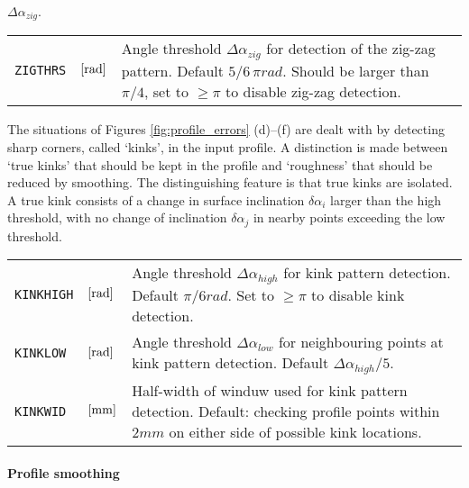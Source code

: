 \documentclass[12pt]{report}
\newenvironment{inputvars}{\vspace{0.4\baselineskip}%

\begin{tabular}{>{\raggedright}p{22mm}p{19mm}p{113mm}}}{
\end{tabular}

}
\newcommand{\inpvar}[3]{{\small\tt #1} & $#2$ & #3 \\[1ex]}
\begin{document}
$\Delta\alpha_{zig}$. 
\begin{inputvars}
\inpvar{ZIGTHRS}{\bunit{rad}}{Angle threshold $\Delta\alpha_{zig}$ for
        detection of the zig-zag pattern. Default $5/6\,\pi\unit{rad}$.
        Should be larger than $\pi/4$, set to $\ge\pi$ to disable zig-zag
        detection.}
\end{inputvars}
The situations of Figures \ref{fig:profile_errors} (d)--(f) are dealt with
by detecting sharp corners, called `kinks', in the input profile. A
distinction is made between `true kinks' that should be kept in the profile
and `roughness' that should be reduced by smoothing. The distinguishing
feature is that true kinks are isolated. A true kink consists of a change
in surface inclination $\delta\alpha_i$ larger than the high threshold,
with no change of inclination $\delta\alpha_j$ in nearby points exceeding
the low threshold. 
\begin{inputvars}
\inpvar{KINKHIGH}{\bunit{rad}}{Angle threshold $\Delta\alpha_{high}$ for
        kink pattern detection. Default $\pi/6\unit{rad}$. Set to $\ge\pi$
        to disable kink detection.}
\inpvar{KINKLOW}{\bunit{rad}}{Angle threshold $\Delta\alpha_{low}$ for
        neighbouring points at kink pattern detection. Default
        $\Delta\alpha_{high}/5$.}
\inpvar{KINKWID}{\bunit{mm}}{Half-width of winduw used for kink pattern
        detection. Default: checking profile points within $2\unit{mm}$ on
        either side of possible kink locations.}
\end{inputvars}

\paragraph{Profile smoothing}
\end{document}

